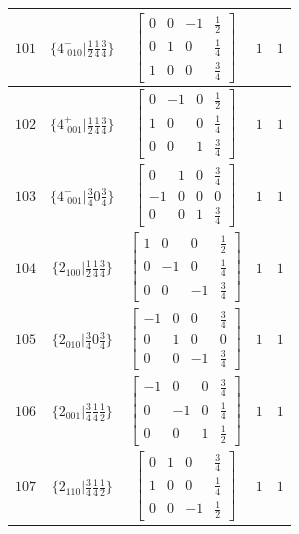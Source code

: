 \documentclass[fleqn,8pt]{jsarticle}
\begin{document}
\begin{longtable}{ccccc}
$ 101 $ & $ \{4^{-}_{\,\,010}|\frac{1}{2} \frac{1}{4} \frac{3}{4}\} $ & $ \begin{bmatrix} 0 & 0 & -1 & \frac{1}{2} \\ 0 & 1 & 0 & \frac{1}{4} \\ 1 & 0 & 0 & \frac{3}{4} \end{bmatrix} $ & $ 1 $ & $ 1 $ \\ \hline
$ 102 $ & $ \{4^{+}_{\,\,001}|\frac{1}{2} \frac{1}{4} \frac{3}{4}\} $ & $ \begin{bmatrix} 0 & -1 & 0 & \frac{1}{2} \\ 1 & 0 & 0 & \frac{1}{4} \\ 0 & 0 & 1 & \frac{3}{4} \end{bmatrix} $ & $ 1 $ & $ 1 $ \\ \hline
$ 103 $ & $ \{4^{-}_{\,\,001}|\frac{3}{4} 0 \frac{3}{4}\} $ & $ \begin{bmatrix} 0 & 1 & 0 & \frac{3}{4} \\ -1 & 0 & 0 & 0 \\ 0 & 0 & 1 & \frac{3}{4} \end{bmatrix} $ & $ 1 $ & $ 1 $ \\ \hline
$ 104 $ & $ \{2{}_{100}|\frac{1}{2} \frac{1}{4} \frac{3}{4}\} $ & $ \begin{bmatrix} 1 & 0 & 0 & \frac{1}{2} \\ 0 & -1 & 0 & \frac{1}{4} \\ 0 & 0 & -1 & \frac{3}{4} \end{bmatrix} $ & $ 1 $ & $ 1 $ \\ \hline
$ 105 $ & $ \{2{}_{010}|\frac{3}{4} 0 \frac{3}{4}\} $ & $ \begin{bmatrix} -1 & 0 & 0 & \frac{3}{4} \\ 0 & 1 & 0 & 0 \\ 0 & 0 & -1 & \frac{3}{4} \end{bmatrix} $ & $ 1 $ & $ 1 $ \\ \hline
$ 106 $ & $ \{2{}_{001}|\frac{3}{4} \frac{1}{4} \frac{1}{2}\} $ & $ \begin{bmatrix} -1 & 0 & 0 & \frac{3}{4} \\ 0 & -1 & 0 & \frac{1}{4} \\ 0 & 0 & 1 & \frac{1}{2} \end{bmatrix} $ & $ 1 $ & $ 1 $ \\ \hline
$ 107 $ & $ \{2{}_{110}|\frac{3}{4} \frac{1}{4} \frac{1}{2}\} $ & $ \begin{bmatrix} 0 & 1 & 0 & \frac{3}{4} \\ 1 & 0 & 0 & \frac{1}{4} \\ 0 & 0 & -1 & \frac{1}{2} \end{bmatrix} $ & $ 1 $ & $ 1 $ \\ \hline

\end{longtable}
\end{document}
